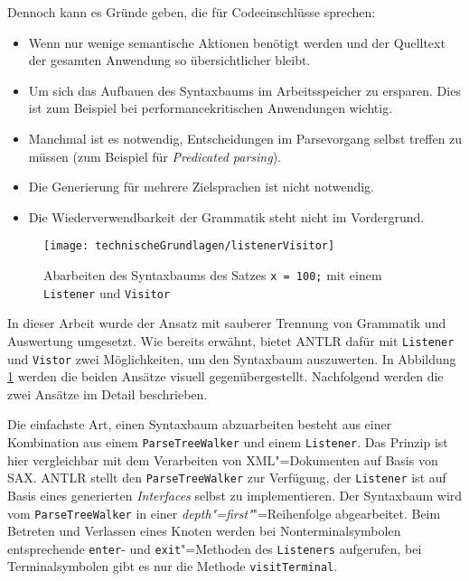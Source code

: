 Dennoch kann es Gründe geben, die für Codeeinschlüsse sprechen:
\begin{itemize}
    \item Wenn nur wenige semantische Aktionen benötigt werden und der Quelltext der gesamten Anwendung so übersichtlicher bleibt.
    \item Um sich das Aufbauen des Syntaxbaums im Arbeitsspeicher zu ersparen. Dies ist zum Beispiel bei performancekritischen Anwendungen wichtig.
    \item Manchmal ist es notwendig, Entscheidungen im Parsevorgang selbst treffen zu müssen (zum Beispiel für \emph{Predicated parsing}).
    \item Die Generierung für mehrere Zielsprachen ist nicht notwendig.
    \item Die Wiederverwendbarkeit der Grammatik steht nicht im Vordergrund.
\end{itemize}

\begin{figure}[b]
    \centering
    \texttt{[image: technischeGrundlagen/listenerVisitor]}
    \caption{Abarbeiten des Syntaxbaums des Satzes \lstinline{x = 100;} mit einem \lstinline{Listener} und \lstinline{Visitor} \cite{ANTLR4Reference}}
    \label{fig:listenerVisitor}
\end{figure}

In dieser Arbeit wurde der Ansatz mit sauberer Trennung von Grammatik und Auswertung umgesetzt. Wie bereits erwähnt, bietet ANTLR dafür mit \lstinline{Listener} und \lstinline{Vistor} zwei Möglichkeiten, um den Syntaxbaum auszuwerten. In Abbildung \ref{fig:listenerVisitor} werden die beiden Ansätze visuell gegenübergestellt. Nachfolgend werden die zwei Ansätze im Detail beschrieben.

Die einfachste Art, einen Syntaxbaum abzuarbeiten besteht aus einer Kombination aus einem \lstinline{ParseTreeWalker} und einem \lstinline{Listener}. Das Prinzip ist hier vergleichbar mit dem Verarbeiten von XML"=Dokumenten auf Basis von SAX. ANTLR stellt den \lstinline{ParseTreeWalker} zur Verfügung, der \lstinline{Listener} ist auf Basis eines generierten \emph{Interfaces} selbst zu implementieren. Der Syntaxbaum wird vom \lstinline{ParseTreeWalker} in einer \emph{depth"=first"}"=Reihenfolge abgearbeitet. Beim Betreten und Verlassen eines Knoten werden bei Nonterminalsymbolen entsprechende \lstinline{enter}- und \lstinline{exit}"=Methoden des \lstinline{Listeners} aufgerufen, bei Terminalsymbolen gibt es nur die Methode \lstinline{visitTerminal}.


